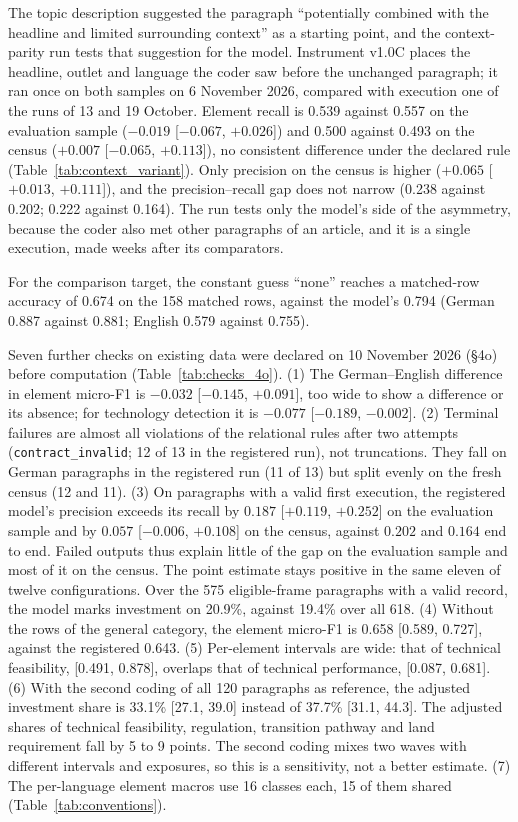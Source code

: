The topic description suggested the paragraph ``potentially combined with the headline and limited surrounding context'' as a starting point, and the context-parity run tests that suggestion for the model. Instrument v1.0C places the headline, outlet and language the coder saw before the unchanged paragraph; it ran once on both samples on 6 November 2026, compared with execution one of the runs of 13 and 19 October. Element recall is 0.539 against 0.557 on the evaluation sample ($-0.019$ [$-0.067$, $+0.026$]) and 0.500 against 0.493 on the census ($+0.007$ [$-0.065$, $+0.113$]), no consistent difference under the declared rule (Table~\ref{tab:context_variant}). Only precision on the census is higher ($+0.065$ [$+0.013$, $+0.111$]), and the precision--recall gap does not narrow (0.238 against 0.202; 0.222 against 0.164). The run tests only the model's side of the asymmetry, because the coder also met other paragraphs of an article, and it is a single execution, made weeks after its comparators.



For the comparison target, the constant guess ``none'' reaches a matched-row accuracy of 0.674 on the 158 matched rows, against the model's 0.794 (German 0.887 against 0.881; English 0.579 against 0.755).

Seven further checks on existing data were declared on 10 November 2026 (\S4o) before computation (Table~\ref{tab:checks_4o}). (1) The German--English difference in element micro-F1 is $-0.032$ [$-0.145$, $+0.091$], too wide to show a difference or its absence; for technology detection it is $-0.077$ [$-0.189$, $-0.002$]. (2) Terminal failures are almost all violations of the relational rules after two attempts (\texttt{contract\_invalid}; 12 of 13 in the registered run), not truncations. They fall on German paragraphs in the registered run (11 of 13) but split evenly on the fresh census (12 and 11). (3) On paragraphs with a valid first execution, the registered model's precision exceeds its recall by $0.187$ [$+0.119$, $+0.252$] on the evaluation sample and by $0.057$ [$-0.006$, $+0.108$] on the census, against $0.202$ and $0.164$ end to end. Failed outputs thus explain little of the gap on the evaluation sample and most of it on the census. The point estimate stays positive in the same eleven of twelve configurations. Over the 575 eligible-frame paragraphs with a valid record, the model marks investment on 20.9\%, against 19.4\% over all 618. (4) Without the rows of the general category, the element micro-F1 is 0.658 [0.589, 0.727], against the registered 0.643. (5) Per-element intervals are wide: that of technical feasibility, [0.491, 0.878], overlaps that of technical performance, [0.087, 0.681]. (6) With the second coding of all 120 paragraphs as reference, the adjusted investment share is 33.1\% [27.1, 39.0] instead of 37.7\% [31.1, 44.3]. The adjusted shares of technical feasibility, regulation, transition pathway and land requirement fall by 5 to 9 points. The second coding mixes two waves with different intervals and exposures, so this is a sensitivity, not a better estimate. (7) The per-language element macros use 16 classes each, 15 of them shared (Table~\ref{tab:conventions}).

